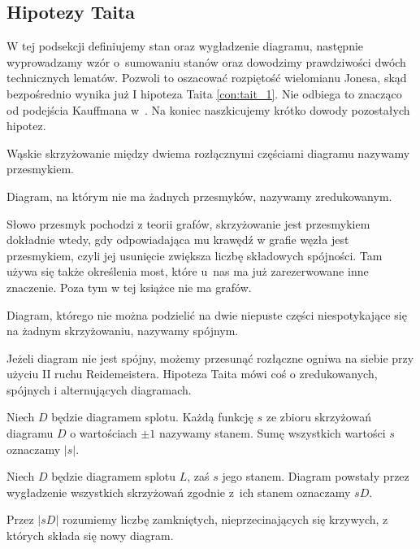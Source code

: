 
\subsection{Hipotezy Taita}
\label{sub:tait_conjectures}%
%
W tej podsekcji definiujemy stan oraz wygładzenie diagramu, następnie wyprowadzamy wzór o~sumowaniu stanów oraz dowodzimy prawdziwości dwóch technicznych lematów.
Pozwoli to oszacować rozpiętość wielomianu Jonesa, skąd bezpośrednio wynika już I hipoteza Taita \ref{con:tait_1}.
Nie odbiega to znacząco od podejścia Kauffmana w~\cite{kauffman87}.
%
Na koniec naszkicujemy krótko dowody pozostałych hipotez.

\begin{definition}
%
%
    Wąskie skrzyżowanie między dwiema rozłącznymi częściami diagramu nazywamy przesmykiem.
\begin{comment}
    \[
        \LargeIsthmus
    \]
\end{comment}
    Diagram, na którym nie ma żadnych przesmyków, nazywamy zredukowanym.
\end{definition}

Słowo przesmyk pochodzi z teorii grafów, skrzyżowanie jest przesmykiem dokładnie wtedy, gdy odpowiadająca mu krawędź w grafie węzła jest przesmykiem, czyli jej usunięcie zwiększa liczbę składowych spójności.
Tam używa się także określenia most, które u~nas ma już zarezerwowane inne znaczenie.
Poza tym w tej książce nie ma grafów.

\begin{definition}
%
    Diagram, którego nie można podzielić na dwie niepuste części niespotykające się na żadnym skrzyżowaniu, nazywamy spójnym.
\end{definition}

Jeżeli diagram nie jest spójny, możemy przesunąć rozłączne ogniwa na siebie przy użyciu II ruchu Reidemeistera.
Hipoteza Taita mówi coś o zredukowanych, spójnych i alternujących diagramach.

\begin{definition}[stan]
%
    Niech $D$ będzie diagramem splotu.
    Każdą funkcję $s$ ze zbioru skrzyżowań diagramu $D$ o wartościach $\pm 1$ nazywamy stanem.
    Sumę wszystkich wartości $s$ oznaczamy $|s|$.
\end{definition}

\begin{definition}
%
    Niech $D$ będzie diagramem splotu $L$, zaś $s$ jego stanem.
    Diagram powstały przez wygładzenie wszystkich skrzyżowań zgodnie z~ich stanem oznaczamy $sD$.

    Przez $|sD|$ rozumiemy liczbę zamkniętych, nieprzecinających się krzywych, z których składa się nowy diagram.
\end{definition}

